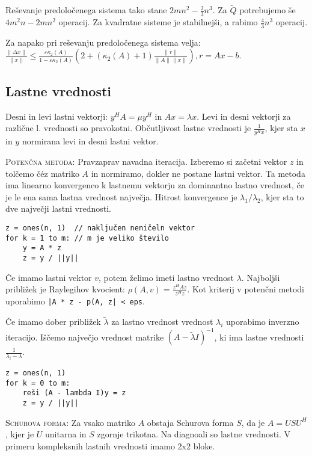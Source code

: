 \documentclass[a4paper,10pt]{article}
\theoremstyle{definition}
\begin{document}
Reševanje predoločenega sistema tako stane $2mn^2 - \frac23n^3$. Za $\tilde{Q}$
potrebujemo še $4m^2n-2mn^2$ operacij. Za kvadratne sisteme je stabilnejši, a
rabimo $\frac43n^3$ operacij.

Za napako pri reševanju predoločenega sistema velja:
$\frac{\|\Delta x\|}{\|x\|} \leq \frac{\varepsilon\kappa_2(A)}{1-\varepsilon\kappa_2(A)}
\left(2+(\kappa_2(A) + 1)\frac{\|r\|}{\|A\|\|x\|} \right), r = Ax -b$.

\subsection*{Lastne vrednosti}
Desni in levi lastni vektorji: $y^HA = \mu y^H$ in $Ax = \lambda x$. Levi in
desni vektorji za različne l. vrednosti so pravokotni. Občutljivost lastne
vrednosti je $\frac{1}{y^Hx}$, kjer sta $x$ in $y$ normirana levi in desni
lastni vektor.

\textsc{Potenčna metoda:} Pravzaprav navadna iteracija. Izberemo si začetni
vektor $z$ in tolčemo č\'{e}z matriko $A$ in normiramo, dokler ne postane lastni vektor. Ta
metoda ima linearno konvergenco k lastnemu vektorju za dominantno lastno
vrednost, če je le ena sama lastna vrednost največja.
Hitrost konvergence je $\lambda_1 / \lambda_2$, kjer sta to dve
največji lastni vrednosti.
\scriptsize
\begin{verbatim}
z = ones(n, 1)  // naključen neničeln vektor
for k = 1 to m: // m je veliko število
    y = A * z
    z = y / ||y||
\end{verbatim}
\normalsize
Če imamo lastni vektor $v$, potem želimo imeti lastno vrednost $\lambda$.
Najboljši približek je Raylegihov kvocient: $\rho(A, v) = \frac{z^H\!\!Az}{z^Hz}$.
Kot kriterij v potenčni metodi uporabimo \verb'|A * z - p(A, z| < eps'.

Če imamo dober približek $\tilde{\lambda}$ za lastno vrednost vrednost
$\lambda_i$ uporabimo inverzno iteracijo. Iščemo največjo vrednost matrike
$(A-\tilde{\lambda}I)^{-1}$, ki
ima lastne vrednosti $\frac{1}{\lambda_i - \lambda}$.
\scriptsize
\begin{verbatim}
z = ones(n, 1)
for k = 0 to m:
    reši (A - lambda I)y = z
    z = y / ||y||
\end{verbatim}
\normalsize

\textsc{Schurova forma:} Za vsako matriko $A$ obstaja Schurova forma $S$, da je $A = USU^H$,
kjer je $U$ unitarna in $S$ zgornje trikotna. Na diagnoali so lastne vrednosti.
V primeru kompleksnih lastnih vrednosti imamo 2x2 bloke.
\end{document}
